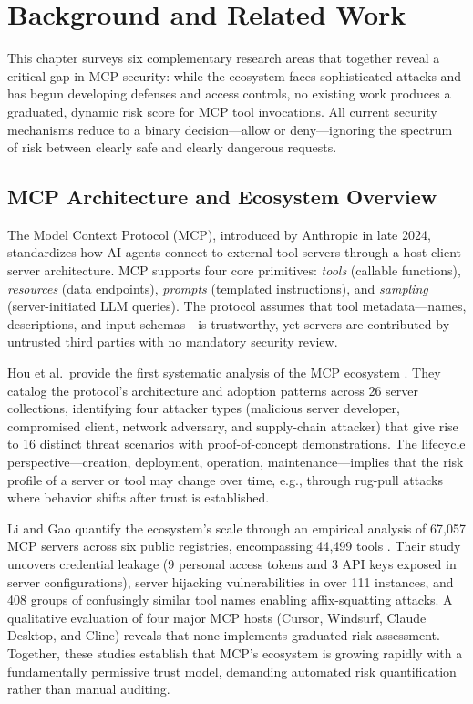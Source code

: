 \documentclass[12pt]{article}
\begin{document}
\section{Background and Related Work}

This chapter surveys six complementary research areas that together reveal a critical gap in MCP security: while the ecosystem faces sophisticated attacks and has begun developing defenses and access controls, no existing work produces a graduated, dynamic risk score for MCP tool invocations. All current security mechanisms reduce to a binary decision---allow or deny---ignoring the spectrum of risk between clearly safe and clearly dangerous requests.

\subsection{MCP Architecture and Ecosystem Overview}

The Model Context Protocol (MCP), introduced by Anthropic in late 2024, standardizes how AI agents connect to external tool servers through a host-client-server architecture. MCP supports four core primitives: \emph{tools} (callable functions), \emph{resources} (data endpoints), \emph{prompts} (templated instructions), and \emph{sampling} (server-initiated LLM queries). The protocol assumes that tool metadata---names, descriptions, and input schemas---is trustworthy, yet servers are contributed by untrusted third parties with no mandatory security review.

Hou et al.\ provide the first systematic analysis of the MCP ecosystem \cite{hou2025mcp_landscape}. They catalog the protocol’s architecture and adoption patterns across 26 server collections, identifying four attacker types (malicious server developer, compromised client, network adversary, and supply-chain attacker) that give rise to 16 distinct threat scenarios with proof-of-concept demonstrations. The lifecycle perspective---creation, deployment, operation, maintenance---implies that the risk profile of a server or tool may change over time, e.g., through rug-pull attacks where behavior shifts after trust is established.

Li and Gao quantify the ecosystem’s scale through an empirical analysis of 67{,}057 MCP servers across six public registries, encompassing 44{,}499 tools \cite{li2025understanding_mcp}. Their study uncovers credential leakage (9 personal access tokens and 3 API keys exposed in server configurations), server hijacking vulnerabilities in over 111 instances, and 408 groups of confusingly similar tool names enabling affix-squatting attacks. A qualitative evaluation of four major MCP hosts (Cursor, Windsurf, Claude Desktop, and Cline) reveals that none implements graduated risk assessment. Together, these studies establish that MCP’s ecosystem is growing rapidly with a fundamentally permissive trust model, demanding automated risk quantification rather than manual auditing.
\end{document}
